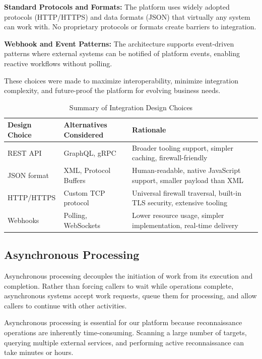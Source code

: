 \documentclass[a4paper,12pt]{report}
\begin{document}
\textbf{Standard Protocols and Formats:} The platform uses widely adopted protocols (HTTP/HTTPS) and data formats (JSON) that virtually any system can work with. No proprietary protocols or formats create barriers to integration.\hfill \break

\textbf{Webhook and Event Patterns:} The architecture supports event-driven patterns where external systems can be notified of platform events, enabling reactive workflows without polling.\hfill \break

\hfill \break These choices were made to maximize interoperability, minimize integration complexity, and future-proof the platform for evolving business needs.

\vspace{1em}
\begin{table}[H]
\centering
\caption{Summary of Integration Design Choices}
\label{tab:integration-choices}
\renewcommand{\arraystretch}{1.3}
\begin{tabular}{|p{3cm}|p{5cm}|p{6.5cm}|}
\hline
\textbf{Design Choice} & \textbf{Alternatives Considered} & \textbf{Rationale} \\
\hline
REST API & GraphQL, gRPC & Broader tooling support, simpler caching, firewall-friendly \\
\hline
JSON format & XML, Protocol Buffers & Human-readable, native JavaScript support, smaller payload than XML \\
\hline
HTTP/HTTPS & Custom TCP protocol & Universal firewall traversal, built-in TLS security, extensive tooling \\
\hline
Webhooks & Polling, WebSockets & Lower resource usage, simpler implementation, real-time delivery \\
\hline
\end{tabular}
\end{table}

\subsection{Asynchronous Processing}

Asynchronous processing decouples the initiation of work from its execution and completion. Rather than forcing callers to wait while operations complete, asynchronous systems accept work requests, queue them for processing, and allow callers to continue with other activities.\hfill \break

Asynchronous processing is essential for our platform because reconnaissance operations are inherently time-consuming. Scanning a large number of targets, querying multiple external services, and performing active reconnaissance can take minutes or hours.\hfill \break
\end{document}
